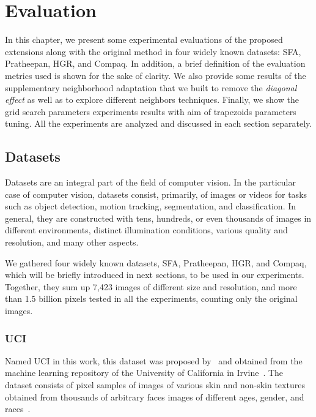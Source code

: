 \chapter{Evaluation}
\label{cap:experimentos}

In this chapter, we present some experimental evaluations of the proposed extensions along with the original method in four widely known datasets: SFA, Pratheepan, HGR, and Compaq. In addition, a brief definition of the evaluation metrics used is shown for the sake of clarity. We also provide some results of the supplementary neighborhood adaptation that we built to remove the \emph{diagonal effect} as well as to explore different neighbors techniques. Finally, we show the grid search parameters experiments results with aim of trapezoids parameters tuning. All the experiments are analyzed and discussed in each section separately.


\section{Datasets}
\label{sec:datasets}
Datasets are an integral part of the field of computer vision. In the particular case of computer vision, datasets consist, primarily, of images or videos for tasks such as object detection, motion tracking, segmentation, and classification. In general, they are constructed with tens, hundreds, or even thousands of images in different environments, distinct illumination conditions, various quality and resolution, and many other aspects.

We gathered four widely known datasets, SFA, Pratheepan, HGR, and Compaq, which will be briefly introduced in next sections, to be used in our experiments. Together, they sum up 7,423 images of different size and resolution, and more than 1.5 billion pixels tested in all the experiments, counting only the original images.


\subsection{UCI}
\label{sec:datasets_uci}
Named UCI in this work, this dataset was proposed by~\citet{uci-skin-dataset:12} and obtained from the machine learning repository of the University of California in Irvine~\citep{lichman:13}. The dataset consists of pixel samples of images of various skin and non-skin textures obtained from thousands of arbitrary faces images of different ages, gender, and races~\citep{pal-texas:04, feret:96}.

